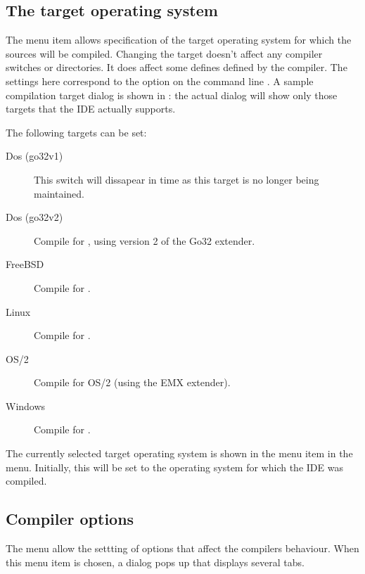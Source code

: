 \subsection{The target operating system}
The menu item  allows  specification of the target
operating system for which the sources will be compiled.
Changing the target doesn't affect any compiler switches or
directories. It does affect some defines defined by the compiler.
The settings here correspond to the option on the command line 
. A sample compilation target dialog is shown in :
the actual dialog will show only those targets that the IDE actually 
supports.


The following targets can be set:
\begin{description}
\item[Dos (go32v1)] This switch will dissapear in time as this target is no
longer being maintained.
\item[Dos (go32v2)] Compile for \dos, using version 2 of the Go32 extender.
\item[FreeBSD] Compile for \freebsd.
\item[Linux] Compile for \linux.
\item[OS/2] Compile for OS/2 (using the EMX extender).
\item[Windows] Compile for \windows.
\end{description}
The currently selected target operating system is shown in the 
 menu item in the  menu. Initially, 
this will be set to the operating system for which the IDE was compiled.
%
%
\subsection{Compiler options}
The menu  allow the settting of options that affect the
compilers behaviour. When this menu item is chosen, a dialog pops up that
displays several tabs.

